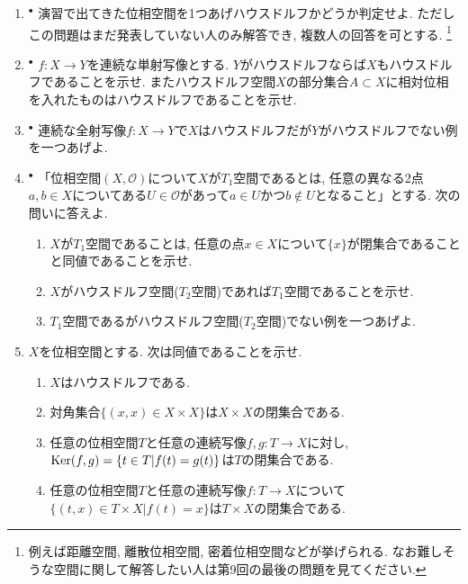 \documentclass[dvipdfmx,a4paper,11pt]{article}
\newcommand{\R}{\mathbb{R}}
\theoremstyle{definition}
\begin{document}
\begin{enumerate}[label=\textbf{問}7.\arabic*]

\item $^{\bullet}$ 演習で出てきた位相空間を1つあげハウスドルフかどうか判定せよ. ただしこの問題はまだ発表していない人のみ解答でき, 複数人の回答を可とする.
\footnote{例えば距離空間, 離散位相空間, 密着位相空間などが挙げられる. なお難しそうな空間に関して解答したい人は第9回の最後の問題を見てください.}

\item $^{\bullet}$ $f : X \rightarrow Y$を連続な単射写像とする. $Y$がハウスドルフならば$X$もハウスドルフであることを示せ. またハウスドルフ空間$X$の部分集合$A \subset X$に相対位相を入れたものはハウスドルフであることを示せ. 
 
 \item $^{\bullet}$ 連続な全射写像$f : X \rightarrow Y$で$X$はハウスドルフだが$Y$がハウスドルフでない例を一つあげよ. 

\item$^{\bullet}$ 「位相空間$(X, \mathscr{O})$について$X$が$T_1$空間であるとは, 任意の異なる2点$a, b \in X$についてある$U \in \mathscr{O}$があって$a \in U$かつ$b \not \in U$となること」とする. 次の問いに答えよ.
	\begin{enumerate}
	 \setlength{\parskip}{0cm}
  \setlength{\itemsep}{2pt} 
	\item $X$が$T_1$空間であることは, 任意の点$x \in X$について$\{ x\}$が閉集合であることと同値であることを示せ.
	\item $X$がハウスドルフ空間($T_2$空間)であれば$T_1$空間であることを示せ.  
	\item $T_1$空間であるがハウスドルフ空間($T_2$空間)でない例を一つあげよ. 
	\end{enumerate}

	

\item $X$を位相空間とする. 次は同値であることを示せ.
\begin{enumerate}[label=(\roman*)]
 \setlength{\parskip}{0cm}
  \setlength{\itemsep}{2pt} 
\item $X$はハウスドルフである.
\item 対角集合$\{ (x,x) \in X \times X\}$は$X \times X$の閉集合である.
\item 任意の位相空間$T$と任意の連続写像$f,g : T \rightarrow X$に対し, ${\rm Ker}(f,g) = \{ t \in T | f(t) =g(t)\}$は$T$の閉集合である.
\item 任意の位相空間$T$と任意の連続写像$f : T \rightarrow X$について$\{ (t,x) \in T \times X | f(t) =x\}$は$T \times X$の閉集合である.
\end{enumerate}




\end{enumerate}
\end{document}
